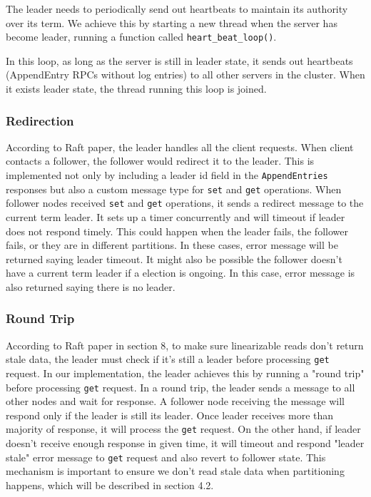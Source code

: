 \documentclass[11pt]{article}
\begin{document}
The leader needs to periodically send out heartbeats to maintain its authority over its term. We achieve this by starting a new thread when the server has become leader, running a function called \texttt{heart\_beat\_loop()}.

In this loop, as long as the server is still in leader state, it sends out heartbeats (AppendEntry RPCs without log entries) to all other servers in the cluster. When it exists leader state, the thread running this loop is joined.

\subsubsection{Redirection}
According to Raft paper, the leader handles all the client requests. When client contacts a follower, the follower would redirect it to the leader. This is implemented not only by including a leader id field in the \texttt{AppendEntries} responses but also a custom message type for \texttt{set} and \texttt{get} operations. When follower nodes received \texttt{set} and \texttt{get} operations,
it sends a redirect message to the current term leader. It sets up a timer concurrently and will timeout if leader does not respond timely. This could happen when the leader fails, the follower fails, or they are in different partitions. In these cases, error message will be returned saying leader timeout. It might also be possible the follower doesn't have a current term leader if a election is ongoing. In this case, error message is also returned saying there is no leader.

\subsubsection{Round Trip}
According to Raft paper in section 8, to make sure linearizable reads don't return stale data, the leader must check if it's still a leader before processing \texttt{get} request. In our implementation, the leader achieves this by running a "round trip" before processing \texttt{get} request. In a round trip, the leader sends a message to all other nodes and wait for response. A follower node receiving the message will respond only if the leader is still its leader. Once leader receives more than majority of response, it will process the \texttt{get} request. On the other hand, if leader doesn't receive enough response in given time, it will timeout and respond "leader stale" error message to \texttt{get} request and also revert to follower state. This mechanism is important to ensure we don't read stale data when partitioning happens, which will be described in section 4.2.
\end{document}
